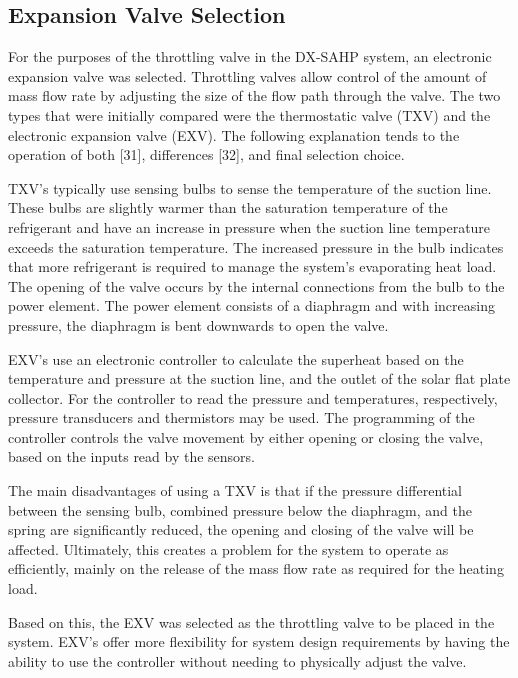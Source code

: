 \subsection{Expansion Valve Selection}

For the purposes of the throttling valve in the DX-SAHP system, an electronic expansion valve was selected. Throttling valves allow control of the amount of mass flow rate by adjusting the size of the flow path through the valve. The two types that were initially compared were the thermostatic valve (TXV) and the electronic expansion valve (EXV). The following explanation tends to the operation of both [31], differences [32], and final selection choice.

\medskip
TXV’s typically use sensing bulbs to sense the temperature of the suction line. These bulbs are slightly warmer than the saturation temperature of the refrigerant and have an increase in pressure when the suction line temperature exceeds the saturation temperature. The increased pressure in the bulb indicates that more refrigerant is required to manage the system’s evaporating heat load. The opening of the valve occurs by the internal connections from the bulb to the power element. The power element consists of a diaphragm and with increasing pressure, the diaphragm is bent downwards to open the valve.

\medskip
EXV’s use an electronic controller to calculate the superheat based on the temperature and pressure at the suction line, and the outlet of the solar flat plate collector. For the controller to read the pressure and temperatures, respectively, pressure transducers and thermistors may be used. The programming of the controller controls the valve movement by either opening or closing the valve, based on the inputs read by the sensors.

\medskip
The main disadvantages of using a TXV is that if the pressure differential between the sensing bulb, combined pressure below the diaphragm, and the spring are significantly reduced, the opening and closing of the valve will be affected. Ultimately, this creates a problem for the system to operate as efficiently, mainly on the release of the mass flow rate as required for the heating load.

\medskip
Based on this, the EXV was selected as the throttling valve to be placed in the system. EXV’s offer more flexibility for system design requirements by having the ability to use the controller without needing to physically adjust the valve.